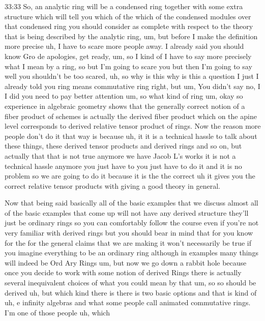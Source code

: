 \begin{unfinished}{33:33}
So, an analytic ring will be a condensed ring together with some extra structure which will tell you which of the which of the condensed modules over that condensed ring you should consider as complete with respect to the theory that is being described by the analytic ring, um, but before I make the definition more precise uh, I have to scare more people away. I already said you should know Gro de apologies, get ready, um, so I kind of I have to say more precisely what I mean by a ring, so but I'm going to scare you but then I'm going to say well you shouldn't be too scared, uh, so why is this why is this a question I just I already told you ring means commutative ring right, but um, You didn't say no, I I did you need to pay better attention um, so what kind of ring um, okay so experience in algebraic geometry shows that the generally correct notion of a fiber product of schemes is actually the derived fiber product which on the apine level corresponds to derived relative tensor product of rings. Now the reason more people don't do it that way is because uh, it it is a technical hassle to talk about these things, these derived tensor products and derived rings and so on, but actually that that is not true anymore we have Jacob L's works it is not a technical hassle anymore you just have to you just have to do it and it is no problem so we are going to do it because it is the the correct uh it gives you the correct relative tensor products with giving a good theory in general.

Now that being said basically all of the basic examples that we discuss almost all of the basic examples that come up will not have any derived structure they'll just be ordinary rings so you can comfortably follow the course even if you're not very familiar with derived rings but you should bear in mind that for you know for the for the general claims that we are making it won't necessarily be true if you imagine everything to be an ordinary ring although in examples many things will indeed be Ord Ary Rings um, but now we go down a rabbit hole because once you decide to work with some notion of derived Rings there is actually several inequivalent choices of what you could mean by that um, so so should be derived uh, but which kind there is there is two basic options and that is kind of uh, e infinity algebras and what some people call animated commutative rings. I'm one of those people uh, which


\end{unfinished}
